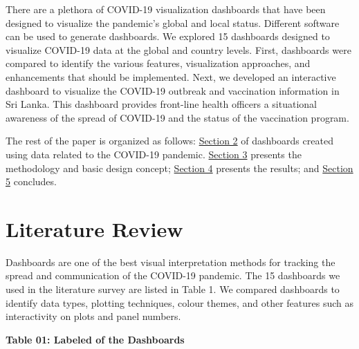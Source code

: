 \documentclass[
]{article}
\begin{document}
There are a plethora of COVID-19 visualization dashboards that have been
designed to visualize the pandemic's global and local status. Different
software can be used to generate dashboards. We explored 15 dashboards
designed to visualize COVID-19 data at the global and country levels.
First, dashboards were compared to identify the various features,
visualization approaches, and enhancements that should be implemented.
Next, we developed an interactive dashboard to visualize the COVID-19
outbreak and vaccination information in Sri Lanka. This dashboard
provides front-line health officers a situational awareness of the
spread of COVID-19 and the status of the vaccination program.

The rest of the paper is organized as follows:
\protect\hyperlink{litreview}{Section 2} of dashboards created using
data related to the COVID-19 pandemic.
\protect\hyperlink{methods}{Section 3} presents the methodology and
basic design concept; \protect\hyperlink{results}{Section 4} presents
the results; and \protect\hyperlink{ux5cux2520conclusion}{Section 5}
concludes.

\hypertarget{litreview}{%
\section{Literature Review}\label{litreview}}

Dashboards are one of the best visual interpretation methods for
tracking the spread and communication of the COVID-19 pandemic. The 15
dashboards we used in the literature survey are listed in Table 1. We
compared dashboards to identify data types, plotting techniques, colour
themes, and other features such as interactivity on plots and panel
numbers.

\textbf{Table 01: Labeled of the Dashboards}
\end{document}
